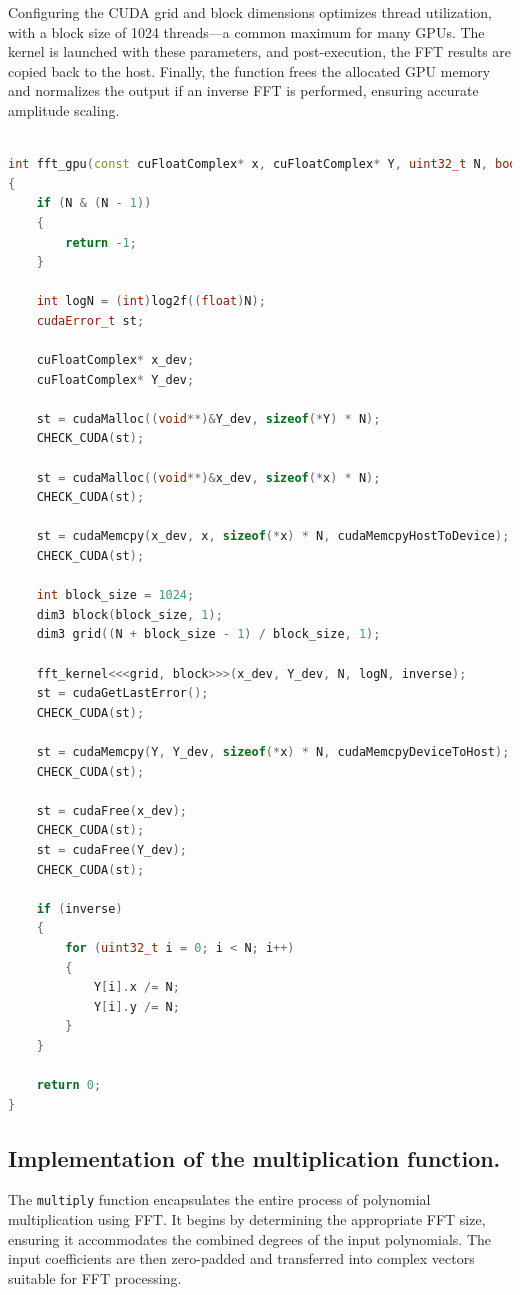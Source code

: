 \documentclass[12pt]{article}
\theoremstyle{definition}
\begin{document}
Configuring the CUDA grid and block dimensions optimizes thread utilization, with a block size of 1024 threads—a common maximum for many GPUs. The kernel is launched with these parameters, and post-execution, the FFT results are copied back to the host. Finally, the function frees the allocated GPU memory and normalizes the output if an inverse FFT is performed, ensuring accurate amplitude scaling.
\begin{lstlisting}[language=C++, caption={Host-Side FFT Function.}]

int fft_gpu(const cuFloatComplex* x, cuFloatComplex* Y, uint32_t N, bool inverse)
{
    if (N & (N - 1))
    {
        return -1;
    }

    int logN = (int)log2f((float)N);
    cudaError_t st;

    cuFloatComplex* x_dev;
    cuFloatComplex* Y_dev;

    st = cudaMalloc((void**)&Y_dev, sizeof(*Y) * N);
    CHECK_CUDA(st);

    st = cudaMalloc((void**)&x_dev, sizeof(*x) * N);
    CHECK_CUDA(st);

    st = cudaMemcpy(x_dev, x, sizeof(*x) * N, cudaMemcpyHostToDevice);
    CHECK_CUDA(st);

    int block_size = 1024;
    dim3 block(block_size, 1);
    dim3 grid((N + block_size - 1) / block_size, 1);

    fft_kernel<<<grid, block>>>(x_dev, Y_dev, N, logN, inverse);
    st = cudaGetLastError();
    CHECK_CUDA(st);

    st = cudaMemcpy(Y, Y_dev, sizeof(*x) * N, cudaMemcpyDeviceToHost);
    CHECK_CUDA(st);

    st = cudaFree(x_dev);
    CHECK_CUDA(st);
    st = cudaFree(Y_dev);
    CHECK_CUDA(st);

    if (inverse)
    {
        for (uint32_t i = 0; i < N; i++)
        {
            Y[i].x /= N;
            Y[i].y /= N;
        }
    }

    return 0;
}
\end{lstlisting}



\subsection{Implementation of the multiplication function.}

The \texttt{multiply} function encapsulates the entire process of polynomial multiplication using FFT. It begins by determining the appropriate FFT size, ensuring it accommodates the combined degrees of the input polynomials. The input coefficients are then zero-padded and transferred into complex vectors suitable for FFT processing.
\end{document}
